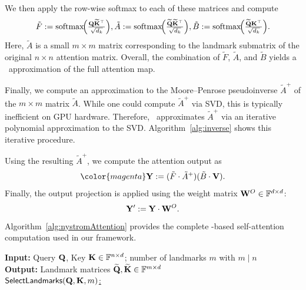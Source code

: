 \documentclass[sigconf,anonymous,review,balance=false]{acmart}
\newcommand{\rev}[1]{{\color{magenta}#1}}
\begin{document}
We then apply the row-wise softmax to each of these matrices and compute
\[
\tilde{F} := {\mathrm{softmax}}\!\Bigl(\tfrac{{\mathbf{Q}}\widetilde{{\mathbf{K}}}^{\top}}{\sqrt{d_k}}\Bigr),
\tilde{A} := {\mathrm{softmax}}\!\Bigl(\tfrac{\widetilde{{\mathbf{Q}}}\widetilde{{\mathbf{K}}}^{\top}}{\sqrt{d_k}}\Bigr),
\tilde{B} := {\mathrm{softmax}}\!\Bigl(\tfrac{\widetilde{{\mathbf{Q}}}{\mathbf{K}}^{\top}}{\sqrt{d_k}}\Bigr).
\]
Here, $\tilde{A}$ is a small $m\times m$ matrix corresponding to the landmark submatrix of the original $n \times n$ attention matrix.
Overall, the combination of $\tilde{F}$, $\tilde{A}$, and $\tilde{B}$ yields a \nystrom\ approximation of the full attention map.

Finally, we compute an approximation to the Moore--Penrose pseudoinverse $\tilde{A}^{+}$ of the $m\times m$ matrix $\tilde{A}$. While one could compute $\tilde{A}^{+}$ via SVD, this is typically inefficient on GPU hardware. Therefore, \nystromformer\ approximates $\tilde{A}^{+}$ via an iterative polynomial approximation to the SVD. Algorithm~\ref{alg:inverse} shows this iterative procedure. 

Using the resulting $\tilde{A}^{+}$, we compute the attention output as
\[
    \rev{\Y := (\tilde{F}\cdot \tilde{A}^{+})(\tilde{B}\cdot\V).}
\]
Finally, the output projection is applied using the weight matrix ${\mathbf{W}}^O \in \mathbb{F}^{d \times d}$:
\[
    {\mathbf{Y}}' := {\mathbf{Y}} \cdot {\mathbf{W}}^O.
\]
Algorithm~\ref{alg:nystromAttention} provides the complete \nystrom-based self-attention computation used in our framework.

\begin{algorithm}[t!]
    \raggedright
    \small
    \begin{minipage}{0.95\linewidth}
    \textbf{Input: } Query ${\mathbf{Q}}$, Key ${\mathbf{K}} \in {\mathbb{F}}^{n \times d}$;
    number of landmarks $m$ with $m \mid n$ \\
    \textbf{Output: } Landmark matrices $\widetilde{{\mathbf{Q}}}, \widetilde{{\mathbf{K}}} \in {\mathbb{F}}^{m \times d}$ \\[2pt]
    \underline{${\sf SelectLandmarks}({\mathbf{Q}}, {\mathbf{K}}, m)$:}\\[2pt]
    \end{minipage}
    \caption{Select landmarks}
    \label{alg:landmark}
\end{algorithm}
\end{document}
